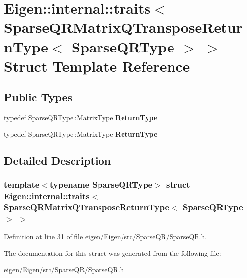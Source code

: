 \hypertarget{struct_eigen_1_1internal_1_1traits_3_01_sparse_q_r_matrix_q_transpose_return_type_3_01_sparse_q_r_type_01_4_01_4}{}\section{Eigen\+:\+:internal\+:\+:traits$<$ Sparse\+Q\+R\+Matrix\+Q\+Transpose\+Return\+Type$<$ Sparse\+Q\+R\+Type $>$ $>$ Struct Template Reference}
\label{struct_eigen_1_1internal_1_1traits_3_01_sparse_q_r_matrix_q_transpose_return_type_3_01_sparse_q_r_type_01_4_01_4}
\subsection*{Public Types}
\begin{DoxyCompactItemize}
\item 
\mbox{\label{struct_eigen_1_1internal_1_1traits_3_01_sparse_q_r_matrix_q_transpose_return_type_3_01_sparse_q_r_type_01_4_01_4_a3d2567bf554756c12327729f4a16ddcc}} 
typedef Sparse\+Q\+R\+Type\+::\+Matrix\+Type {\bfseries Return\+Type}
\item 
\mbox{\label{struct_eigen_1_1internal_1_1traits_3_01_sparse_q_r_matrix_q_transpose_return_type_3_01_sparse_q_r_type_01_4_01_4_a3d2567bf554756c12327729f4a16ddcc}} 
typedef Sparse\+Q\+R\+Type\+::\+Matrix\+Type {\bfseries Return\+Type}
\end{DoxyCompactItemize}


\subsection{Detailed Description}
\subsubsection*{template$<$typename Sparse\+Q\+R\+Type$>$\newline
struct Eigen\+::internal\+::traits$<$ Sparse\+Q\+R\+Matrix\+Q\+Transpose\+Return\+Type$<$ Sparse\+Q\+R\+Type $>$ $>$}



Definition at line \hyperlink{eigen_2_eigen_2src_2_sparse_q_r_2_sparse_q_r_8h_source_l00031}{31} of file \hyperlink{eigen_2_eigen_2src_2_sparse_q_r_2_sparse_q_r_8h_source}{eigen/\+Eigen/src/\+Sparse\+Q\+R/\+Sparse\+Q\+R.\+h}.



The documentation for this struct was generated from the following file\+:\begin{DoxyCompactItemize}
\item 
eigen/\+Eigen/src/\+Sparse\+Q\+R/\+Sparse\+Q\+R.\+h\end{DoxyCompactItemize}
